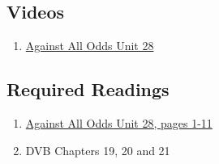 \documentclass[letterpaper,10pt,twocolumn,twoside,]{pinp}
\providecommand{\tightlist}{%
  \setlength{\itemsep}{0pt}\setlength{\parskip}{0pt}}
\begin{document}
\hypertarget{videos-3}{%
\subsection{Videos}\label{videos-3}}

\begin{enumerate}
\def\labelenumi{\arabic{enumi}.}
\tightlist
\item
  \href{https://www.learner.org/series/against-all-odds-inside-statistics/inference-for-proportions/}{Against
  All Odds Unit 28}
\end{enumerate}

\hypertarget{required-readings-4}{%
\subsection{Required Readings}\label{required-readings-4}}

\begin{enumerate}
\item \href{https://www.learner.org/wp-content/uploads/2019/03/AgainstAllOdds_StudentGuide_Unit28-Inference-for-Proportions.pdf}{Against All Odds Unit 28, pages 1-11}
\item DVB Chapters 19, 20 and 21
\end{enumerate}





\end{document}
